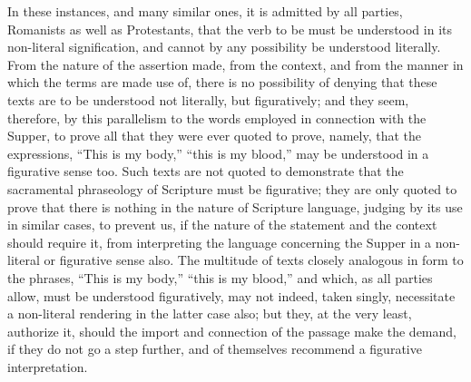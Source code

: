 \documentclass[]{book}
\begin{document}
In these instances, and many similar ones, it is admitted by all parties, Romanists as well as Protestants, that the verb to be must be understood in its non-literal signification, and cannot by any possibility be understood literally. From the nature of the assertion made, from the context, and from the manner in which the terms are made use of, there is no possibility of denying that these texts are to be understood not literally, but figuratively; and they seem, therefore, by this parallelism to the words employed in connection with the Supper, to prove all that they were ever quoted to prove, namely, that the expressions, ``This is my body,'' ``this is my blood,'' may be understood in a figurative sense too. Such texts are not quoted to demonstrate that the sacramental phraseology of Scripture must be figurative; they are only quoted to prove that there is nothing in the nature of Scripture language, judging by its use in similar cases, to prevent us, if the nature of the statement and the context should require it, from interpreting the language concerning the Supper in a non-literal or figurative sense also. The multitude of texts closely analogous in form to the phrases, ``This is my body,'' ``this is my blood,'' and which, as all parties allow, must be understood figuratively, may not indeed, taken singly, necessitate a non-literal rendering in the latter case also; but they, at the very least, authorize it, should the import and connection of the passage make the demand, if they do not go a step further, and of themselves recommend a figurative interpretation.
\end{document}
